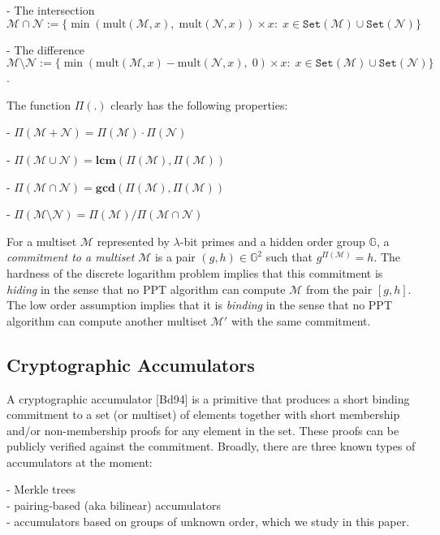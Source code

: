 \documentclass[11pt, lettersize, notitlepage, leqno, footskip=0.6cm]{article}
\newcommand{\ttt}{\texttt}
\newcommand{\bG}{\mathbb{G}}
\newcommand{\sett}{\ttt{Set}}
\newcommand{\mul}{\mr{mult}}
\newcommand{\mc}{\mathcal}
\newcommand{\mbf}{\mathbf}
\newcommand{\mr}{\mathrm}
\newcommand{\sm}{\setminus}
\newcommand{\lam}{\lambda}
\newcommand{\mcM}{\mc{M}}
\newcommand{\noin}{\noindent}
\newcommand{\LCM}{\mbf{lcm}}
\newcommand{\GCD}{\mbf{gcd}}
\numberwithin{equation}{section}
\begin{document}
\noin - The intersection $\mc{M}\cap \mc{N} := \{\min(\mul(\mc{M},x),\;\mul(\mc{N},x))\times x:\;x\in \sett(\mc{M})\cup\sett(\mc{N})\}$

\noin - The difference $\mc{M}\sm \mc{N} := \{\min(\mul(\mc{M},x)-\mul(\mc{N},x),\; 0)\times x:\;x\in \sett(\mc{M})\cup\sett(\mc{N})\}$.\vspace{0.1cm}

\noin The function $\Pi(.)$ clearly has the following properties:

\noin- $\Pi(\mc{M}+\mc{N})= \Pi(\mc{M})\cdot\Pi(\mc{N})$

\noin - $\Pi(\mc{M}\cup \mc{N}) = \LCM(\Pi(\mc{M}), \Pi(\mc{M}))$

\noin - $\Pi(\mc{M}\cap \mc{N}) = \GCD(\Pi(\mc{M}), \Pi(\mc{M}))$

\noin - $\Pi(\mc{M}\sm \mc{N}) = {\Pi(\mc{M})}/{\Pi(\mc{M}\cap \mc{N})}$\vspace{0.1cm}

For a multiset $\mc{M}$ represented by $\lam$-bit primes and a hidden order group $\bG$, a \textit{commitment to a multiset} $\mc{M}$ is a pair $(g, h)\in\bG^2$ such that $g^{\Pi(\mc{M})} = h$. The hardness of the discrete logarithm problem implies that this commitment is \textit{hiding} in the sense that no PPT algorithm can compute $\mcM$ from the pair $[g,h]$. The low order assumption implies that it is \textit{binding} in the sense that no PPT algorithm can compute another multiset $\mcM'$ with the same commitment.

\subsection{\fontsize{11}{11}\selectfont Cryptographic Accumulators }

A cryptographic accumulator [Bd94] is a primitive that produces a short binding commitment to a set (or multiset) of elements together with short membership and/or non-membership proofs for any element in the set. These proofs can be publicly verified against the commitment. Broadly, there are three known types of accumulators at the moment: 

\noin - Merkle trees\\
- pairing-based (aka bilinear) accumulators \\  
- accumulators based on groups of unknown order, which we study in this paper. 
\end{document}
